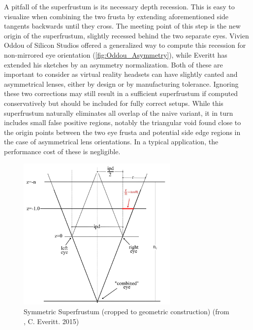 A pitfall of the superfrustum is its necessary depth recession. This is easy to visualize when combining the two frusta by extending aforementioned side tangents backwards until they cross. The meeting point of this step is the new origin of the superfrustum, slightly recessed behind the two separate eyes. 
Vivien Oddou of Silicon Studios offered a generalized way to compute this recession for non-mirrored eye orientation \cite{Oddou.23.05.2017}(\autoref{fig:Oddou_Asymmetry}), while Everitt has extended his sketches by an asymmetry normalization\cite{Everitt.2015b}. Both of these are important to consider as virtual reality headsets can have slightly canted and asymmetrical lenses, either by design or by manufacturing tolerance. Ignoring these two corrections may still result in a sufficient superfrustum if computed conservatively but should be included for fully correct setups. 
While this superfrustum naturally eliminates all overlap of the naive variant, it in turn includes small false positive regions, notably the triangular void found close to the origin points between the two eye frusta and potential side edge regions in the case of asymmetrical lens orientations. In a typical application, the performance cost of these is negligible. 

\begin{figure}[htb]
  \centering
  \includegraphics[width=0.7\textwidth]{pictures/Everitt_Superfrustum_Crop}
  \caption{Symmetric Superfrustum (cropped to geometric construction) (from \cite{Everitt.2015}, C. Everitt. 2015)} \label{fig:Everitt_Superfrustum}
\end{figure}

